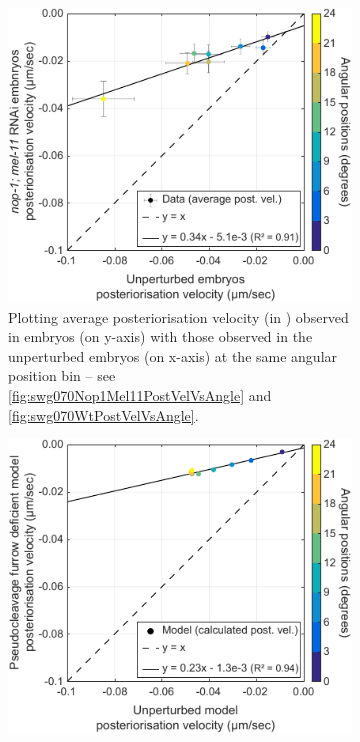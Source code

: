 \begin{figure}
    \centering
    \begin{subfigure}[t]{0.45\textwidth}
        \includegraphics[width=\textwidth]{Results/FigComparePCF/compareExpt.pdf}
        \caption{Plotting average posteriorisation velocity (in \si{\unitPostVel}) observed in  embryos (on y-axis) with those observed in the unperturbed embryos (on x-axis) at the same angular position bin -- see \autoref{fig:swg070Nop1Mel11PostVelVsAngle} and \autoref{fig:swg070WtPostVelVsAngle}.}
        \label{subfig:compareUnperturbedPcfRemove-expt}
    \end{subfigure}
    \hfill
    \begin{subfigure}[t]{0.45\textwidth}
        \includegraphics[width=\textwidth]{Results/FigComparePCF/compareModel.pdf}

\end{subfigure}
\end{figure}
